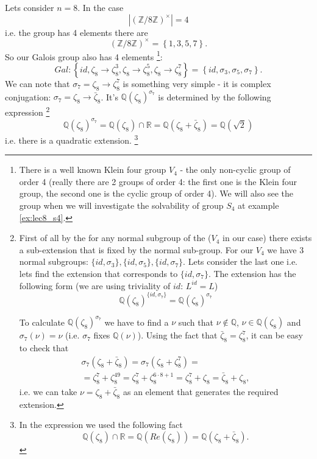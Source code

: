 \begin{example}[$n=8$]
  Lets consider $n = 8$. In the case
  \[
  \left|\left(\mathbb{Z}/8\mathbb{Z}\right)^\times\right| = 4
  \]
  i.e. the group has 4 elements there are
  \[
  \left(\mathbb{Z}/8\mathbb{Z}\right)^\times =
  \left\{
  1,3,5,7
  \right\}.
  \]
  So our Galois group also has 4 elements
  \footnote{
    There is a well known Klein four group $V_4$ \cite{wiki:klein4group} -
    the only non-cyclic group of order 4 (really there are 2 groups of
    order 4: the first one is the Klein four group, the second one is
    the cyclic group of order 4). We will also see the group when we
    will investigate the solvability of group $S_4$ at example
    \ref{ex:lec8_s4}. 
  }:
  \[
  Gal: \left\{
  id, \zeta_8 \to \zeta_8^3,
  \zeta_8 \to \zeta_8^5, \zeta_8 \to \zeta_8^7
  \right\} =
  \left\{
  id, \sigma_3, \sigma_5, \sigma_7
  \right\}.
  \]
  We can note that $\sigma_7 = \zeta_8 \to \zeta_8^7$ is something
  very simple - it is complex conjugation:
  $\sigma_7 = \zeta_8 \to \bar{\zeta}_8$. It's
   $\mathbb{Q}\left(\zeta_8\right)^{\sigma_7}$
  is determined by the following expression
  \footnote{
    First of all by the  for
    any normal subgroup of the  ($V_4$ in our
    case) there exists a sub-extension that is fixed by the normal
    sub-group. For our $V_4$ we have 3 normal subgroups:
    $\{id, \sigma_3\}, \{id, \sigma_5\}, \{id, \sigma_7\}$. Lets
    consider the last one i.e. lets find the extension that corresponds
    to $\{id, \sigma_7\}$. The extension has the following form (we
    are using triviality of $id$: $L^{id} = L$)
    \[
    \mathbb{Q}\left(\zeta_8\right)^{\{id, \sigma_7\}} =
    \mathbb{Q}\left(\zeta_8\right)^{\sigma_7}
    \]

    To calculate $\mathbb{Q}\left(\zeta_8\right)^{\sigma_7}$ we have
    to find a  $\nu$ such
    that $\nu \notin \mathbb{Q}$, $\nu \in
    \mathbb{Q}\left(\zeta_8\right)$ and $\sigma_7\left(\nu\right) =
    \nu$ (i.e. $\sigma_7$ fixes $\mathbb{Q}\left(\nu\right)$).
    Using the fact that $\bar{\zeta}_8 = \zeta_8^7$, it can
    be easy to check that
    \begin{eqnarray}
      \sigma_7\left(\zeta_8 + \bar{\zeta}_8\right) =
      \sigma_7\left(\zeta_8 + \zeta_8^7\right) =
      \nonumber \\
      =
      \zeta_8^7 + \zeta_8^{49} =
      \zeta_8^7 + \zeta_8^{6 \cdot 8 + 1} =
      \zeta_8^7 + \zeta_8 = \bar{\zeta}_8 + \zeta_8,
      \nonumber
    \end{eqnarray}
    i.e. we can take $\nu = \zeta_8 + \bar{\zeta}_8$ as an element
    that generates the required extension.
  }
  \[
  \mathbb{Q}\left(\zeta_8\right)^{\sigma_7} =
  \mathbb{Q}\left(\zeta_8\right) \cap \mathbb{R} =
  \mathbb{Q}\left(\zeta_8 + \bar{\zeta}_8\right) =
  \mathbb{Q}\left(\sqrt{2}\right)
  \]
  i.e. there is a quadratic extension.
  \footnote{
    In the expression we used the following fact
    \[
    \mathbb{Q}\left(\zeta_8\right) \cap \mathbb{R} =
    \mathbb{Q}\left(Re\left(\zeta_8\right)\right) =
    \mathbb{Q}\left(\zeta_8 + \bar{\zeta}_8\right).
    \]
  }



\end{example}
